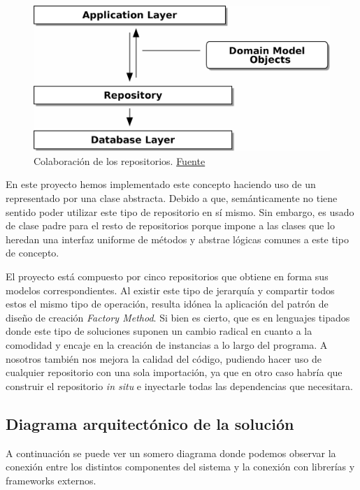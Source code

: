 \FloatBarrier
\begin{figure}[h]
	\centering	
	\includegraphics[width=\textwidth]{doc/logos/imgs/repopattern.png}
    \caption{Colaboración de los repositorios.
    \href{https://www.cosmicpython.com/book/images/apwp_0205.png}{Fuente} }
    \label{fig:repo-pattern}
\end{figure}
\FloatBarrier

En este proyecto hemos implementado este concepto haciendo uso de un
 representado por una clase abstracta. Debido a que,
semánticamente no tiene sentido poder utilizar este tipo de repositorio en sí mismo. Sin
embargo, es usado de clase padre para el resto de repositorios porque impone a las clases
que lo heredan una interfaz uniforme de métodos y abstrae lógicas comunes a este tipo de
concepto.

El proyecto está compuesto por cinco repositorios que obtiene en forma sus modelos
correspondientes. Al existir este tipo de jerarquía y compartir todos estos el mismo tipo
de operación, resulta idónea la aplicación del patrón de diseño de creación
\textit{Factory Method}. Si bien es cierto, que es en lenguajes tipados donde este tipo de
soluciones suponen un cambio radical en cuanto a la comodidad y encaje en la creación de
instancias a lo largo del programa. A nosotros también nos mejora la calidad del código,
pudiendo hacer uso de cualquier repositorio con una sola importación, ya que en otro caso
habría que construir el repositorio \textit{in situ} e inyectarle todas las dependencias
que necesitara.


\subsection{Diagrama arquitectónico de la solución}
A continuación se puede ver un somero diagrama donde podemos observar la conexión entre
los distintos componentes del sistema y la conexión con librerías y frameworks externos. 

